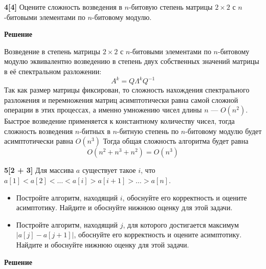 \documentclass{article}
\begin{document}
\textbf{4[4]} Оцените сложность возведения в $n$-битовую степень матрицы $2 \times 2$ с $n$-битовыми элементами по $n$-битовому модулю.

\medskip

\textbf{Решение}

Возведение в степень матрицы $2 \times 2$ с
$n$-битовыми элементами по $n$-битовому модулю
эквивалентно возведению в степень двух собственных
значений матрицы в её спектральном разложении:
\[
    A^k = Q \Lambda^k Q^{-1}
\]
Так как размер матрицы фиксирован, то сложность
нахождения спектрального разложения и перемножения
матриц асимптотически равна самой сложной операции
в этих процессах, а именно умножению чисел длины
$n$ --- $O(n^2)$. Быстрое возведение применяется
к константному количеству чисел, тогда сложность
возведения $n$-битных в $n$-битную степень по $n$-битовому
модулю будет асимптотически равна $O(n^3)$
Тогда общая сложность алгоритма будет равна
\[
    O(n^2 + n^3 + n^2) = O(n^3)
\]

\medskip

\textbf{5[2 + 3]} Для массива $a$ существует такое $i$, что $a[1] < a[2] < \dots < a[i] > a[i+1] > \dots > a[n]$.

\begin{itemize}
    \item Постройте алгоритм, находящий $i$, обоснуйте его корректность и оцените асимптотику. Найдите и обоснуйте нижнюю оценку для этой задачи.
    \item Постройте алгоритм, находящий $j$, для которого достигается максимум $|a[j] - a[j+1]|$, обоснуйте его корректность и оцените асимптотику. Найдите и обоснуйте нижнюю оценку для этой задачи.
\end{itemize}

\medskip

\textbf{Решение}
\end{document}

